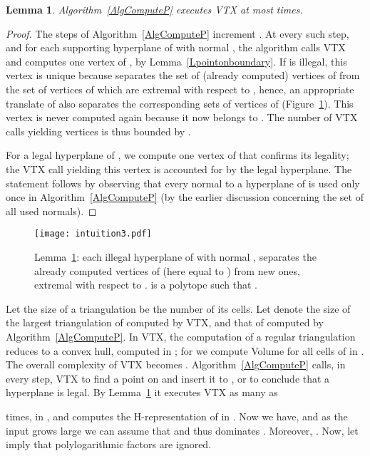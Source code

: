 \documentclass{article}
\newtheorem{lemma}{Lemma}
\begin{document}
\begin{lemma}\label{Loneperhplane}
Algorithm~\ref{AlgComputeP} 
executes {VTX}
at most  
times.
\end{lemma}
\begin{proof}
The steps of Algorithm~\ref{AlgComputeP} increment .
At every such step, and for each supporting hyperplane  of  with normal
, 
the algorithm calls {VTX}
and computes one vertex of , 
by Lemma~\ref{Lpointonboundary}.
If  is illegal, this vertex is unique 
because  separates the set of (already computed) vertices of  from the set
of vertices of  which are extremal with respect to ,
hence, an appropriate translate of  also separates the corresponding sets of
vertices of  (Figure~\ref{fig:oneperhplane}).
This vertex is never computed again because it now belongs to .
The number of {VTX} calls
yielding vertices is thus bounded by .

For a legal hyperplane of , we compute one vertex of 
that confirms its legality; the 
{VTX} call
yielding this vertex is accounted for by the legal hyperplane.
The statement follows by observing that 
every normal to a hyperplane of  is used only once
in Algorithm~\ref{AlgComputeP}
(by the earlier discussion concerning the set  of all used normals).
\end{proof}

\begin{figure}[t]
\centering
\texttt{[image: intuition3.pdf]}
\caption{Lemma~\ref{Loneperhplane}: each illegal hyperplane of  with normal
, separates
the already computed vertices of  (here equal to ) from new ones,
extremal with respect to .  is a polytope
such that .}
\label{fig:oneperhplane}
\end{figure}

Let the size of a triangulation be the number of its cells.
Let  denote the size of the largest triangulation of 
computed by {VTX}, and  that
of  computed by Algorithm~\ref{AlgComputeP}.
In {VTX}, the computation of a regular triangulation reduces to a
convex hull, computed in ;
for  we compute Volume for all cells of  in .
The overall complexity of {VTX} becomes .
Algorithm~\ref{AlgComputeP} calls, in every step, {VTX} 
to find a point on  and insert it to ,
or to conclude that a hyperplane is legal.
By Lemma~\ref{Loneperhplane} it executes {VTX} as many as 
 
times, in 
, and
computes the H-representation of  in .
Now we have,
 and as the input  grows large
we can assume that  and thus  dominates
. Moreover, .
Now, let
 imply that polylogarithmic factors are ignored.
\end{document}
